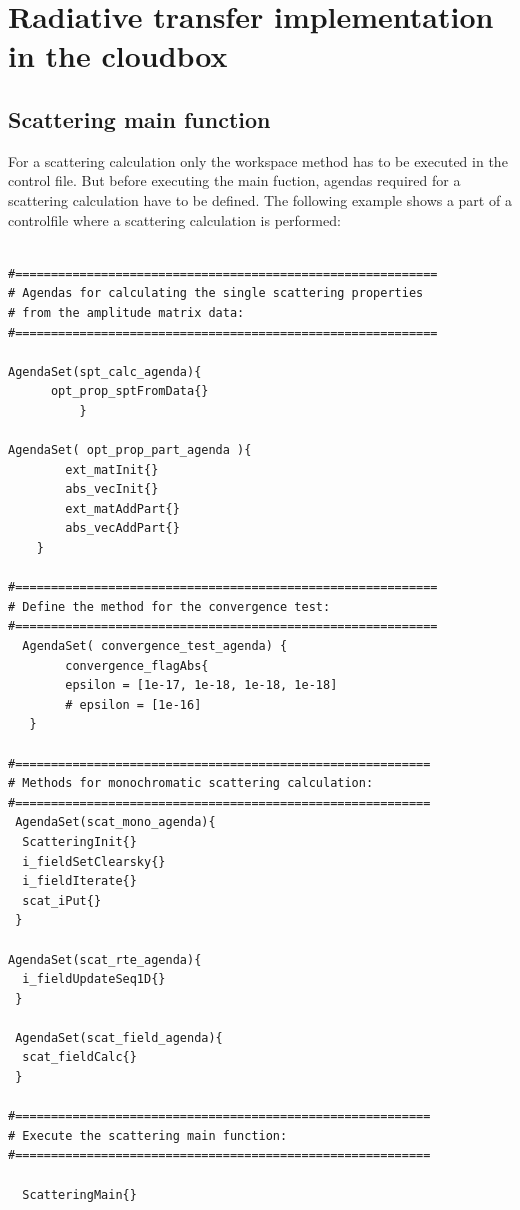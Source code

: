 \section{Radiative transfer implementation in the cloudbox}
\label{sec:scattering:rt_cloudbox}


\subsection{Scattering main function}
\label{sec:scattering:main_function}
For a scattering calculation only the workspace method
 has to be executed in the control file.  But
before executing the main fuction, agendas required for a scattering
calculation have to be defined.  The following example shows a part of
a controlfile where a scattering calculation is performed:
\begin{verbatim}

#===========================================================
# Agendas for calculating the single scattering properties
# from the amplitude matrix data:
#===========================================================

AgendaSet(spt_calc_agenda){
      opt_prop_sptFromData{}
          }
 
AgendaSet( opt_prop_part_agenda ){
        ext_matInit{}
        abs_vecInit{}
        ext_matAddPart{}
        abs_vecAddPart{}
    }
 
#===========================================================
# Define the method for the convergence test:
#===========================================================
  AgendaSet( convergence_test_agenda) {
        convergence_flagAbs{
        epsilon = [1e-17, 1e-18, 1e-18, 1e-18] 
        # epsilon = [1e-16]
   }
  
#==========================================================
# Methods for monochromatic scattering calculation:
#==========================================================
 AgendaSet(scat_mono_agenda){
  ScatteringInit{}              
  i_fieldSetClearsky{}
  i_fieldIterate{}
  scat_iPut{}
 }
 
AgendaSet(scat_rte_agenda){
  i_fieldUpdateSeq1D{}
 }
        
 AgendaSet(scat_field_agenda){
  scat_fieldCalc{}
 }      
               
#==========================================================
# Execute the scattering main function:
#==========================================================       
        
  ScatteringMain{}

\end{verbatim}


